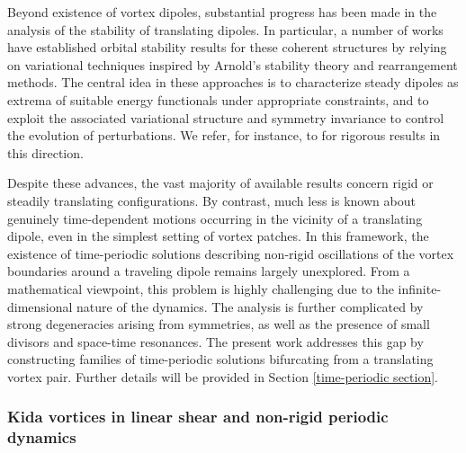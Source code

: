 \documentclass[a4paper,reqno,10pt]{article}
\begin{document}
Beyond existence of vortex dipoles, substantial progress has been made in the analysis of the stability of translating dipoles. In particular, a number of works have established orbital stability results for these coherent structures by relying on variational techniques inspired by Arnold’s stability theory and rearrangement methods. The central idea in these approaches is to characterize steady dipoles as extrema of suitable energy functionals under appropriate constraints, and to exploit the associated variational structure and symmetry invariance to control the evolution of perturbations. We refer, for instance, to \cite{Abe1, Abe2, Burton, Burton2, wang} for rigorous results in this direction.



Despite these advances, the vast majority of available results concern rigid or steadily translating configurations. By contrast, much less is known about genuinely time-dependent motions occurring in the vicinity of a translating dipole, even in the simplest setting of vortex patches. In this framework, the existence of time-periodic solutions describing non-rigid oscillations of the vortex boundaries around a traveling dipole remains largely unexplored.
From a mathematical viewpoint, this problem is highly challenging due to the infinite-dimensional nature of the dynamics. The analysis is further complicated by strong degeneracies arising from symmetries, as well as the presence of small divisors and space-time resonances.
The present work addresses this gap by constructing families of time-periodic solutions bifurcating from a translating vortex pair. Further details will be provided in Section \ref{time-periodic section}.


\subsubsection{Kida vortices in linear shear and non-rigid periodic dynamics}
\end{document}
